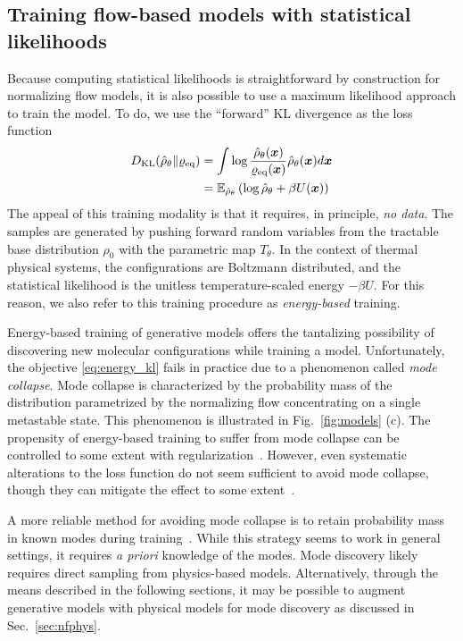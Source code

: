 \documentclass[11pt]{article}
\begin{document}
\subsection{Training flow-based models with statistical likelihoods} \label{sec:nfs}

Because computing statistical likelihoods is straightforward by construction for normalizing flow models, it is also possible to use a maximum likelihood approach to train the model. 
To do, we use the ``forward'' KL divergence as the loss function
\begin{equation}
\begin{aligned}
    D_{\rm KL}(\hat\rho_{\theta} \| \varrho_{\rm eq}) &= \int \log \frac{\hat\rho_{\theta}(\boldsymbol{x})}{\varrho_{\rm eq}(\boldsymbol{x})} \hat\rho_{\theta}(\boldsymbol{x}) d\boldsymbol{x} \\
    &= \mathbb{E}_{\hat\rho_\theta} \left( \log \hat\rho_{\theta} + \beta U(\boldsymbol{x}) \right)
    \label{eq:energy_kl}
\end{aligned}
\end{equation}
The appeal of this training modality is that it requires, in principle, \emph{no data}.
The samples are generated by pushing forward random variables from the tractable base distribution $\rho_0$ with the parametric map $T_{\theta}$.
In the context of thermal physical systems, the configurations are Boltzmann distributed, and the statistical likelihood is the unitless temperature-scaled energy $-\beta U.$
For this reason, we also refer to this training procedure as \textit{energy-based} training.

Energy-based training of generative models offers the tantalizing possibility of discovering new molecular configurations while training a model. 
Unfortunately, the objective \eqref{eq:energy_kl} fails in practice due to a phenomenon called \textit{mode collapse}. 
Mode collapse is characterized by the probability mass of the distribution parametrized by the normalizing flow concentrating on a single metastable state.
This phenomenon is illustrated in Fig.~\ref{fig:models} (c).
The propensity of energy-based training to suffer from mode collapse can be controlled to some extent with regularization~\cite{del_debbio_efficient_2021}.
However, even systematic alterations to the loss function do not seem sufficient to avoid mode collapse, though they can mitigate the effect to some extent~\cite{felardos_designing_2023}.

A more reliable method for avoiding mode collapse is to retain probability mass in known modes during training~\cite{gabrie_adaptive_2022}.
While this strategy seems to work in general settings, it requires \emph{a priori} knowledge of the modes.
Mode discovery likely requires direct sampling from physics-based models.
Alternatively, through the means described in the following sections, it may be possible to augment generative models with physical models for mode discovery as discussed in Sec.~\ref{sec:nfphys}. 
\end{document}
